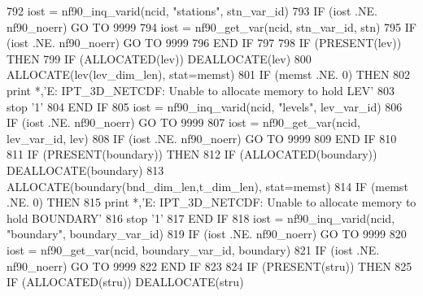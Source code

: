 \begin{DoxyCode}
792         iost = nf90\_inq\_varid(ncid, \textcolor{stringliteral}{"stations"}, stn\_var\_id)
793         \textcolor{keywordflow}{IF} (iost .NE. nf90\_noerr) \textcolor{keywordflow}{GO TO} 9999
794         iost = nf90\_get\_var(ncid, stn\_var\_id, stn)
795         \textcolor{keywordflow}{IF} (iost .NE. nf90\_noerr) \textcolor{keywordflow}{GO TO} 9999
796 \textcolor{keywordflow}{    END IF}
797 
798     \textcolor{keywordflow}{IF} (\textcolor{keyword}{PRESENT}(lev)) \textcolor{keywordflow}{THEN}
799         \textcolor{keywordflow}{IF} (\textcolor{keyword}{ALLOCATED}(lev))         \textcolor{keyword}{DEALLOCATE}(lev)
800         \textcolor{keyword}{ALLOCATE}(lev(lev\_dim\_len), stat=memst)
801         \textcolor{keywordflow}{IF} (memst .NE. 0) \textcolor{keywordflow}{THEN}
802             print *,\textcolor{stringliteral}{'E: IPT\_3D\_NETCDF: Unable to allocate memory to hold LEV'}
803             stop \textcolor{stringliteral}{'1'}
804 \textcolor{keywordflow}{        END IF}
805         iost = nf90\_inq\_varid(ncid, \textcolor{stringliteral}{"levels"}, lev\_var\_id)
806         \textcolor{keywordflow}{IF} (iost .NE. nf90\_noerr) \textcolor{keywordflow}{GO TO} 9999
807         iost = nf90\_get\_var(ncid, lev\_var\_id, lev)
808         \textcolor{keywordflow}{IF} (iost .NE. nf90\_noerr) \textcolor{keywordflow}{GO TO} 9999
809 \textcolor{keywordflow}{    END IF}
810 
811     \textcolor{keywordflow}{IF} (\textcolor{keyword}{PRESENT}(boundary)) \textcolor{keywordflow}{THEN}
812         \textcolor{keywordflow}{IF} (\textcolor{keyword}{ALLOCATED}(boundary))    \textcolor{keyword}{DEALLOCATE}(boundary)
813         \textcolor{keyword}{ALLOCATE}(boundary(bnd\_dim\_len,t\_dim\_len), stat=memst)
814         \textcolor{keywordflow}{IF} (memst .NE. 0) \textcolor{keywordflow}{THEN}
815             print *,\textcolor{stringliteral}{'E: IPT\_3D\_NETCDF: Unable to allocate memory to hold BOUNDARY'}
816             stop \textcolor{stringliteral}{'1'}
817 \textcolor{keywordflow}{        END IF}
818         iost = nf90\_inq\_varid(ncid, \textcolor{stringliteral}{"boundary"}, boundary\_var\_id)
819         \textcolor{keywordflow}{IF} (iost .NE. nf90\_noerr) \textcolor{keywordflow}{GO TO} 9999
820         iost = nf90\_get\_var(ncid, boundary\_var\_id, boundary)
821         \textcolor{keywordflow}{IF} (iost .NE. nf90\_noerr) \textcolor{keywordflow}{GO TO} 9999
822 \textcolor{keywordflow}{    END IF}
823 
824     \textcolor{keywordflow}{IF} (\textcolor{keyword}{PRESENT}(stru)) \textcolor{keywordflow}{THEN}
825         \textcolor{keywordflow}{IF} (\textcolor{keyword}{ALLOCATED}(stru))        \textcolor{keyword}{DEALLOCATE}(stru)

\end{DoxyCode}
